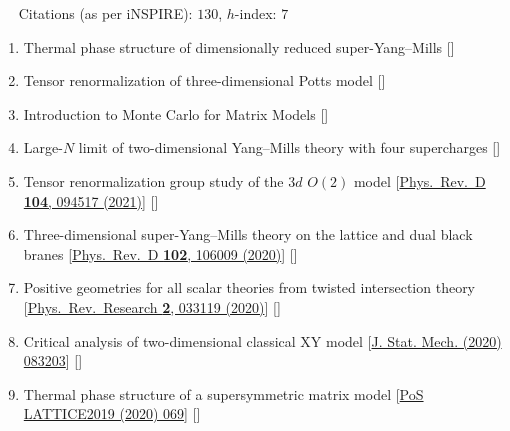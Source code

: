 ~~ Citations (as per iNSPIRE): $130$, $h$-index: $7$
\begin{enumerate}
\item Thermal phase structure of dimensionally reduced super-Yang--Mills [\texttt{\textbf{}}] 
\item Tensor renormalization of three-dimensional Potts model [\texttt{\textbf{}}] 
 \item Introduction to Monte Carlo for Matrix Models [\texttt{\textbf{}}] 
 \item Large-$N$ limit of two-dimensional Yang--Mills theory with four supercharges [\texttt{\textbf{}}] 
 \item Tensor renormalization group study of the $3d$ $O(2)$ model [\href{https://journals.aps.org/prd/abstract/10.1103/PhysRevD.104.094517}{Phys.\ Rev.\ D {\bf 104}, 094517 (2021)}]
 [\texttt{\textbf{}}] 
 \item Three-dimensional super-Yang--Mills theory on the lattice and dual black branes [\href{https://journals.aps.org/prd/abstract/10.1103/PhysRevD.102.106009}{Phys.\ Rev.\ D {\bf 102}, 106009 (2020)}] [\textbf{\texttt{}}] 
 \item Positive geometries for all scalar theories from twisted intersection theory [\href{https://journals.aps.org/prresearch/abstract/10.1103/PhysRevResearch.2.033119}{Phys.\ Rev.\ Research {\bf 2}, 033119 (2020)}] [\texttt{\textbf{}}] 
  \item Critical analysis of two-dimensional classical XY model [\href{https://iopscience.iop.org/article/10.1088/1742-5468/aba686/pdf}{J. Stat. Mech. (2020) 083203}] [\texttt{\textbf{}}] 
 \item Thermal phase structure of a supersymmetric matrix model [\href{https://pos.sissa.it/363/069}{PoS LATTICE2019 (2020) 069}] [\texttt{\textbf{}}] %

\end{enumerate}
